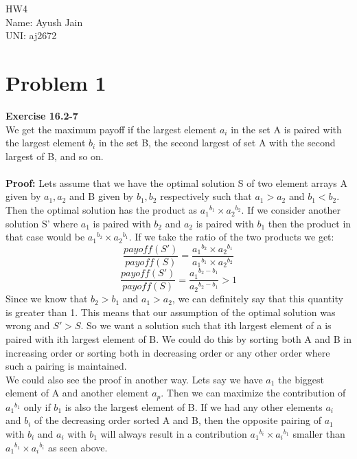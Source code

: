 \documentclass[10pt]{article}
\begin{document}
\vspace*{\fill}
\begin{Huge}
\begin{center}
HW4\\
Name: Ayush Jain\\
UNI: aj2672
\end{center}
\end{Huge}
\vspace*{\fill}
\newpage
\section{Problem 1}
\textbf{Exercise 16.2-7}\\
We get the maximum payoff if the largest element $a_i$ in the set A is paired with the largest element $b_i$ in the set B, the second largest of set A with the second largest of B, and so on.\\\\
\textbf{Proof:} Lets assume that we have the optimal solution S of two element arrays A given by $a_1, a_2$ and B given by $b_1, b_2$ respectively such that $a_1 > a_2$ and $b_1 < b_2$. Then the optimal solution has the product as ${a_{1}}^{b_1} \times {a_2}^{b_2}$. If we consider another solution S' where $a_1$ is paired with $b_2$ and $a_2$ is paired with $b_1$ then the product in that case would be ${a_1}^{b_2}\times {a_2}^{b_1}$. If we take the ratio of the two products we get:\\
$$\dfrac{payoff(S')}{payoff(S)} = \dfrac{{a_1}^{b_2}\times {a_2}^{b_1}}{{a_1}^{b_1}\times {a_2}^{b_2}}$$
$$\dfrac{payoff(S')}{payoff(S)} = \dfrac{{a_1}^{b_2 - b_1}}{{a_2}^{b_2 - b_1}} > 1 $$
Since we know that $b_2 > b_1$ and $a_1 > a_2$, we can definitely say that this quantity is greater than 1. This means that our assumption of the optimal solution was wrong and $S' > S$. So we want a solution such that ith largest element of a is paired with ith largest element of B.  We could do this by sorting both A and B in increasing order or sorting both in decreasing order or any other order where such a pairing is maintained.\\
We could also see the proof in another way. Lets say we have $a_1$ the biggest element of A and another element $a_p$. Then we can maximize the contribution of ${a_1}^{b_1}$ only if $b_1 $ is also the largest element of B. If we had any other elements $a_i$ and $b_i$ of the decreasing order sorted A and B, then the opposite pairing of $a_1$ with $b_i$ and $a_i$ with $b_1$ will always result in a contribution ${a_1}^{b_i}\times {a_i}^{b_1}$ smaller than ${a_1}^{b_1}\times {a_i}^{b_i}$ as seen above.\\\\
\end{document}
